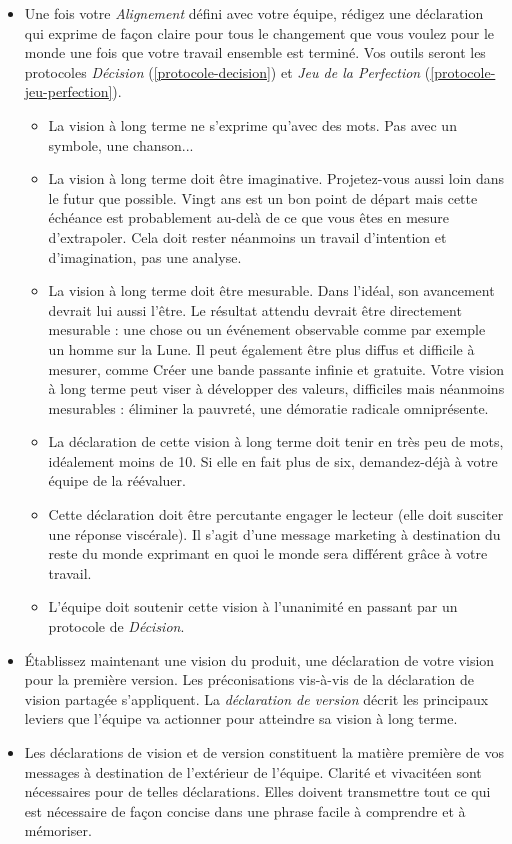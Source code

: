 \documentclass[paper=6in:9in,pagesize=pdftex,headinclude=on,footinclude=on,12pt]{scrbook}
\newcommand*{\numref}[1]{{\hyperref[{#1}]{\autoref*{#1}}}}
\begin{document}
\begin{itemize}
	\item Une fois votre \emph{Alignement} défini avec votre équipe, rédigez une déclaration qui exprime de façon claire
	      pour tous le changement que vous voulez pour le monde une fois que votre travail ensemble est terminé.
	      Vos outils seront les protocoles \emph{Décision} (\numref{protocole-decision}) et \emph{Jeu de la Perfection}
	      (\numref{protocole-jeu-perfection}).
	      \begin{itemize}
	      	\item La vision à long terme ne s'exprime qu'avec des mots. Pas avec un symbole, une chanson...
	      	\item La vision à long terme doit être imaginative. Pro\-jetez-vous aussi loin dans le futur que possible.
	      	      Vingt ans est un bon point de départ mais cette échéance est probablement au-delà de ce que vous
	      	      êtes en mesure d'extrapoler. Cela doit rester néanmoins un travail d'intention et d'imagination,
	      	      pas une analyse.
	      	\item La vision à long terme doit être mesurable. Dans l'idéal, son avancement devrait lui aussi l'être.
	      	      Le résultat attendu devrait être directement mesurable : une chose ou un événement observable comme
	      	      par exemple \og{}un homme sur la Lune\fg{}. Il peut également être plus diffus et difficile à mesurer,
	      	      comme \og{}Créer une bande passante infinie et gratuite\fg{}. Votre vision à long terme peut viser à
	      	      développer des valeurs, difficiles mais néanmoins mesurables : \og{}éliminer la pauvreté\fg{},
	      	      \og{}une démoratie radicale omniprésente\fg{}.
			\item La déclaration de cette vision à long terme doit tenir en très peu de mots, idéalement moins de 10.
			      Si elle en fait plus de six, demandez-déjà à votre équipe de la réévaluer.
			\item Cette déclaration doit être percutante engager le lecteur (elle doit susciter une réponse viscérale).
			      Il s'agit d'une message marketing à destination du reste du monde exprimant en quoi le monde sera
			      différent grâce à votre travail.
			\item L'équipe doit soutenir cette vision à l'unanimité en passant par un protocole de \emph{Décision}.
	      \end{itemize}
	\item Établissez maintenant une vision du produit, une déclaration de votre vision pour la première version. Les
	      préconisations vis-à-vis de la déclaration de vision partagée s'appliquent. La \emph{déclaration de version}
	      décrit les principaux leviers que l'équipe va actionner pour atteindre sa vision à long terme.
	\item Les déclarations de vision et de version constituent la matière première de vos messages à destination de
	      l'extérieur de l'équipe. Clarité et vivacitéen sont nécessaires pour de telles déclarations. Elles doivent
	      transmettre tout ce qui est nécessaire de façon concise dans une phrase facile à comprendre et à mémoriser.
\end{itemize}
\end{document}
